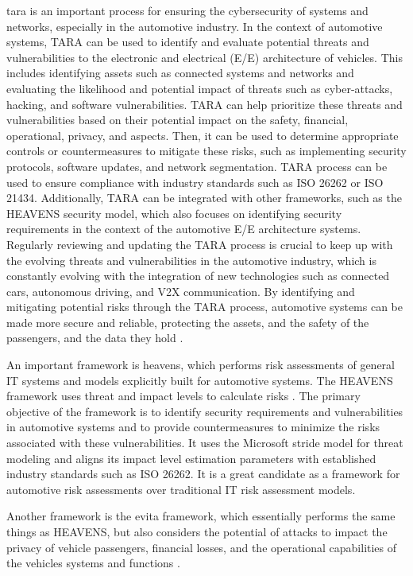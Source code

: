 \gls{tara} is an important process for ensuring the cybersecurity of systems and networks, especially in the automotive industry. 
In the context of automotive systems, TARA can be used to identify and evaluate potential threats and vulnerabilities to the electronic and electrical (E/E) architecture of vehicles. 
This includes identifying assets such as connected systems and networks and evaluating the likelihood and potential impact of threats such as cyber-attacks, hacking, and software vulnerabilities.
TARA can help prioritize these threats and vulnerabilities based on their potential impact on the safety, financial, operational, privacy, and aspects. 
Then, it can be used to determine appropriate controls or countermeasures to mitigate these risks, such as implementing security protocols, software updates, and network segmentation.
TARA process can be used to ensure compliance with industry standards such as ISO 26262 or ISO 21434. 
Additionally, TARA can be integrated with other frameworks, such as the HEAVENS security model, which also focuses on identifying security requirements in the context of the automotive E/E architecture systems.
Regularly reviewing and updating the TARA process is crucial to keep up with the evolving threats and vulnerabilities in the automotive industry, 
which is constantly evolving with the integration of new technologies such as connected cars, autonomous driving, and V2X communication. 
By identifying and mitigating potential risks through the TARA process, automotive systems can be made more secure and reliable, protecting the assets, and the safety of the passengers, and the data they hold \cite{tara}.

An important framework is \gls{heavens}, which performs risk assessments of general IT systems and models explicitly built for automotive systems. 
The HEAVENS framework uses threat and impact levels to calculate risks \cite{heavens}.
The primary objective of the framework is to identify security requirements and vulnerabilities in automotive systems and to provide countermeasures to minimize the risks associated with these vulnerabilities. 
It uses the Microsoft \acrshort{stride} model for threat modeling and aligns its impact level estimation parameters with established industry standards such as ISO 26262. 
It is a great candidate as a framework for automotive risk assessments over traditional IT risk assessment models.

Another framework is the \gls{evita} framework, which essentially performs the same things as HEAVENS, 
but also considers the potential of attacks to impact the privacy of vehicle passengers, financial losses, 
and the operational capabilities of the vehicles systems and functions \cite{evita}.\\


